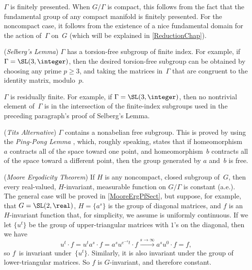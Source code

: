 \smallbreak

  $\Gamma$ is finitely presented. When $G/\Gamma$ is compact, this follows from the fact that the fundamental group of any compact manifold is finitely presented. For the noncompact case, it follows from the existence of a nice fundamental domain for the action of~$\Gamma$ on~$G$ (which will be explained in \cref{ReductionChap}).

\smallbreak

 (\emph{Selberg's Lemma}) $\Gamma$ has a torsion-free subgroup of finite index. For example, if $\Gamma = \SL(3,\integer)$, then the desired torsion-free subgroup can be obtained by choosing any prime $p \ge 3$, and taking the matrices in~$\Gamma$ that are congruent to the identity matrix, modulo~$p$.

\smallbreak

 $\Gamma$ is residually finite. For example, if $\Gamma = \SL(3,\integer)$, then no nontrivial element of~$\Gamma$ is in the intersection of the finite-index subgroups used in the preceding paragraph's %
proof of Selberg's Lemma.

\smallbreak

 (\emph{Tits Alternative}) $\Gamma$ contains a nonabelian free subgroup. This is proved by using the \emph{Ping-Pong Lemma} , which, roughly speaking, states that if homeomorphism~$a$ contracts all of the space toward one point, and homeomorphism~$b$ contracts all of the space toward a different point, then the group generated by $a$ and~$b$ is free.
	

\smallbreak

 (\emph{Moore Ergodicity Theorem}) If $H$ is any noncompact, closed subgroup of~$G$, then every real-valued, $H$-invariant, measurable function on $G/\Gamma$ is constant (a.e.). 
The general case will be proved in \cref{MooreErgPfSect},
but suppose, for example, that $G = \SL(2,\real)$, $H = \{a^s\}$ is the group of diagonal matrices, and $f$ is an $H$-invariant function that, for simplicity, we assume is uniformly continuous. If we let $\{u^t\}$ be the group of upper-triangular matrices with $1$'s on the diagonal, then we have
	$$ u^t \cdot f = u^t a^s \cdot f = a^s u^{e^{-s} t} \cdot f \stackrel{s \to \infty}{\ \longrightarrow\ } a^s u^0 \cdot f = f ,$$
so $f$~is invariant under~$\{u^t\}$. Similarly, it is also invariant under the group of lower-triangular matrices. So $f$ is $G$-invariant, and therefore constant. 





